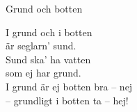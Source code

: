\begin{song}{Grund och botten}
	
	
	
	I grund och i botten\\
	är seglarn' sund.\\
	Sund ska' ha vatten\\
	som ej har grund.\\
	I grund är ej botten bra -- nej\\
	-- grundligt i botten ta -- hej!
	
\end{song}
